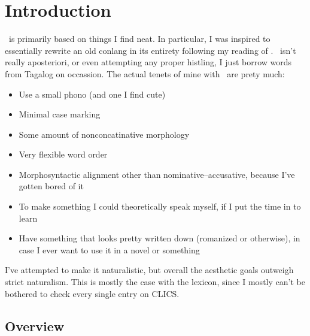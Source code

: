 \chapter{Introduction}
\langname\ is primarily based on things I find neat. In particular, I was inspired to essentially rewrite an old conlang in its entirety following my reading of \cite{Otanes72}. \langname\ isn't really aposteriori, or even attempting any proper histling, I just borrow words from Tagalog on occassion. The actual tenets of mine with \langname\ are prety much:

\begin{itemize}
  \item Use a small phono (and one I find cute)
  \item Minimal case marking
  \item Some amount of nonconcatinative morphology
  \item Very flexible word order
  \item Morphosyntactic alignment other than nominative--accusative, because I've gotten bored of it
  \item To make something I could theoretically speak myself, if I put the time in to learn
  \item Have something that looks pretty written down (romanized or otherwise), in case I ever want to use it in a novel or something
\end{itemize}

I've attempted to make it naturalistic, but overall the aesthetic goals outweigh strict naturalism. This is mostly the case with the lexicon, since I mostly can't be bothered to check every single entry on CLICS.

\section{Overview}